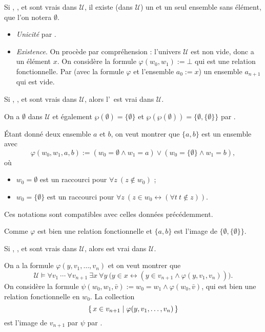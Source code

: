 \documentclass[./main]{subfiles}
\begin{document}
  \begin{thm}
    Si , ,  et  sont vrais dans  $\mathcal{U}$, il existe (dans $\mathcal{U}$) un et un seul ensemble sans élément, que l'on notera $\emptyset$.
  \end{thm}
  \begin{prv}
    \begin{itemize}
      \item \textit{Unicité} par .
      \item  \textit{Existence}.
        On procède par compréhension : l'univers $\mathcal{U}$ est non vide, donc a un élément $x$.
        On considère la formule $\varphi(w_0, w_1) := \bot$ qui est une relation fonctionnelle.
        Par  (avec la formule $\varphi$ et l'ensemble  $a_0 := x$) un ensemble $a_{n+1}$ qui est vide.
    \end{itemize}
  \end{prv}

  \begin{prop}
    Si , ,  et  sont vrais dans  $\mathcal{U}$, alors l'\pairaxiom\ est vrai dans $\mathcal{U}$.
  \end{prop}
  \begin{prv}
    On a $\emptyset$ dans $\mathcal{U}$ et également $\wp(\emptyset) = \{\emptyset\}$ et $\wp(\wp(\emptyset)) = \{\emptyset, \{\emptyset\}\}$ par .

    Étant donné deux ensemble $a$ et $b$, on veut montrer que $\{a,b\}$ est un ensemble avec  \[
    \varphi(w_0, w_1, a, b) := (w_0 = \emptyset \land w_1 = a) \lor (w_0 = \{\emptyset\} \land w_1 = b)
    ,\]
    où 
    \begin{itemize}
      \item $w_0 = \emptyset$ est un raccourci pour $\forall z \: (z \not\in w_0)$ ;
      \item $w_0 = \{\emptyset\} $ est un raccourci pour $\forall z \: (z \in w_0 \leftrightarrow (\forall t \: t \not\in z))$.
    \end{itemize}
    Ces notations sont compatibles avec celles données précédemment.

    Comme  $\varphi$ est bien une relation fonctionnelle et $\{a,b\}$  est l'image de $ \{\emptyset, \{\emptyset\}\}$.
  \end{prv}

  \begin{prop}
    Si , ,  et  sont vrais dans  $\mathcal{U}$, alors  est vrai dans $\mathcal{U}$.
  \end{prop}
  \begin{prv}
    On a la formule $\varphi(y, v_1, \ldots, v_n)$ et on veut montrer que 
    \[
    \mathcal{U} \models \forall v_1 \: \cdots \: \forall v_{n+1} \: \exists x \: \forall y \: \big(
      y \in x \leftrightarrow (y \in v_{n+1} \land \varphi(y, v_1, v_n))
    \big)
    .\]
    On considère la formule $\psi(w_0, w_1, \bar{v}) := w_0 = w_1 \land \varphi(w_0, \bar{v})$, qui est bien une relation fonctionnelle en $w_0$.
    La collection \[
    \mleft\{\,x \in v_{n+1} \;\middle|\; \varphi(y, v_1, \ldots, v_n)\,\mright\}
    \] est l'image de $v_{n+1}$ par $\psi$ par .
  \end{prv}
\end{document}
